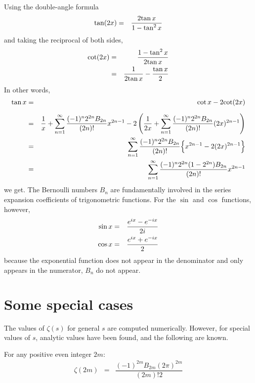 \documentclass[uplatex,a4j,12pt,dvipdfmx]{jsarticle}
\begin{document}
Using the double-angle formula
\begin{eqnarray}
	{\rm tan} (2x)
	&=&
	\dfrac{ 2 {\rm tan} \ \! x }{ 1 - {\rm tan}^{2} \ \! x }
\end{eqnarray}
and taking the reciprocal of both sides,
\begin{eqnarray}
	{\rm cot} (2x)
	&=&
	\dfrac{ 1 - {\rm tan}^{2} \ \! x }{2 {\rm tan} \ \! x }
	\nonumber \\ &=&
	\dfrac{1}{2 {\rm tan} \ \! x }
	-
	\dfrac{{\rm tan} \ \! x}{2}
\end{eqnarray}
In other words,
\begin{eqnarray}
	{\rm tan} \ \! x
	&=&
	{ \rm cot } \ \! x
	-
	2 { \rm cot } (2x)
	\nonumber \\[2mm] &=&
	\dfrac{1}{x}
	+
	\sum_{n=1}^{\infty}
	\dfrac{(-1)^{n} 2^{2n} B_{2n} }{(2n)!}
	x^{2n-1}
	-
	2
	\left(
	\dfrac{1}{2x}
	+
	\sum_{n=1}^{\infty}
	\dfrac{(-1)^{n} 2^{2n} B_{2n} }{(2n)!}
		(2x)^{2n-1}
	\right)
	\nonumber \\ &=&
	\sum_{n=1}^{\infty}
	\dfrac{(-1)^{n} 2^{2n} B_{2n} }{(2n)!}
	\Big\{
	x^{2n-1}
	-
	2
	(2x)^{2n-1}
	\Big\}
	\nonumber \\ &=&
	\sum_{n=1}^{\infty}
	\dfrac{(-1)^{n} 2^{2n} ( 1 - 2^{2n} ) B_{2n} }{(2n)!}
	x^{2n-1}
\end{eqnarray}
we get.
The Bernoulli numbers $B_{n}$ are fundamentally involved in the series expansion coefficients of trigonometric functions.
For the $\sin$ and $\cos$ functions, however,
\begin{eqnarray}
	{\rm sin} \ \! x
	&=&
	\dfrac{e^{ix} - e^{-ix}}{2i}
	\\
	{\rm cos} \ \! x
	&=&
	\dfrac{e^{ix} + e^{-ix}}{2}
\end{eqnarray}
because the exponential function does not appear in the denominator and only appears in the numerator, $B_{n}$ do not appear.




\section{Some special cases}

The values of $\zeta(s)$ for general $s$ are computed numerically.
However, for special values of $s$, analytic values have been found, and the following are known.

For any positive even integer $2m$:
\begin{eqnarray}
	\zeta(2m)
	&=&
	\dfrac{(-1)^{2m} B_{2m} (2 \pi)^{2m} }{(2m)! 2}
\end{eqnarray}
\end{document}
